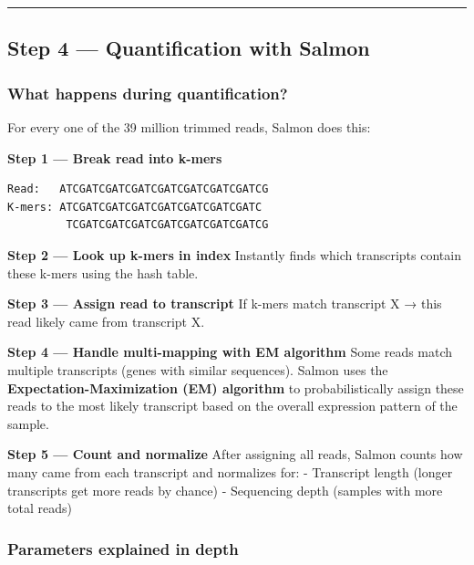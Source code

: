 \documentclass[
]{article}
\begin{document}
\begin{center}\rule{0.5\linewidth}{0.5pt}\end{center}

\subsection{Step 4 --- Quantification with
Salmon}\label{step-4-quantification-with-salmon}

\subsubsection{What happens during
quantification?}\label{what-happens-during-quantification}

For every one of the 39 million trimmed reads, Salmon does this:

\textbf{Step 1 --- Break read into k-mers}

\begin{verbatim}
Read:   ATCGATCGATCGATCGATCGATCGATCGATCG
K-mers: ATCGATCGATCGATCGATCGATCGATCGATC
         TCGATCGATCGATCGATCGATCGATCGATCG
\end{verbatim}

\textbf{Step 2 --- Look up k-mers in index} Instantly finds which
transcripts contain these k-mers using the hash table.

\textbf{Step 3 --- Assign read to transcript} If k-mers match transcript
X → this read likely came from transcript X.

\textbf{Step 4 --- Handle multi-mapping with EM algorithm} Some reads
match multiple transcripts (genes with similar sequences). Salmon uses
the \textbf{Expectation-Maximization (EM) algorithm} to
probabilistically assign these reads to the most likely transcript based
on the overall expression pattern of the sample.

\textbf{Step 5 --- Count and normalize} After assigning all reads,
Salmon counts how many came from each transcript and normalizes for: -
Transcript length (longer transcripts get more reads by chance) -
Sequencing depth (samples with more total reads)

\subsubsection{Parameters explained in
depth}\label{parameters-explained-in-depth}
\end{document}
